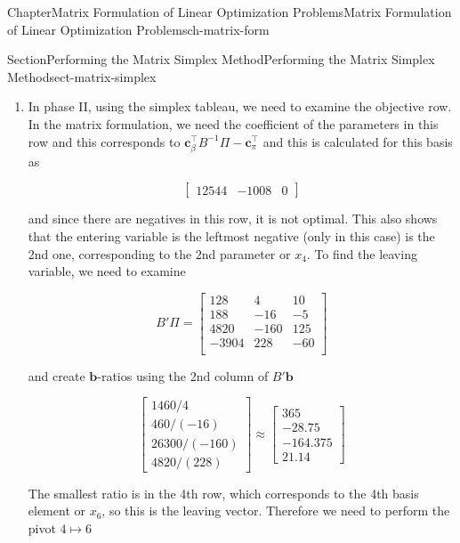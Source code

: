 \documentclass[oneside,10pt,]{book}
\numberwithin{equation}{section}
\newcommand{\amp}{&}
\begin{document}
\begin{chapterptx}{Chapter}{Matrix Formulation of Linear Optimization Problems}{}{Matrix Formulation of Linear Optimization Problems}{}{}{ch-matrix-form}
\begin{sectionptx}{Section}{Performing the Matrix Simplex Method}{}{Performing the Matrix Simplex Method}{}{}{sect-matrix-simplex}
\begin{introduction}{}
\begin{enumerate}
\begin{equation*}
\end{equation*}
%
\par
There are no negatives in this vector so phase I is complete and we move to phase II.%
\item{}In phase II, using the simplex tableau, we need to examine the objective row. In the matrix formulation, we need the coefficient of the parameters in this row and this corresponds to \(\boldsymbol{c}_{\beta}^{\intercal}B^{-1}\Pi - \boldsymbol{c}_{\pi}^{\intercal}\) and this is calculated for this basis as%
\par
%
\begin{equation*}
\begin{bmatrix} 12544 \amp  -1008  \amp 0 \end{bmatrix}
\end{equation*}
%
\par
and since there are negatives in this row, it is not optimal. This also shows that the entering variable is the leftmost negative (only in this case) is the 2nd one, corresponding to the 2nd parameter or \(x_4\). To find the leaving variable, we need to examine%
\par
%
\begin{equation*}
B' \Pi = \begin{bmatrix} 128 \amp    4 \amp  10 \\ 188 \amp  -16 \amp  -5 \\ 4820 \amp -160 \amp 125 \\ -3904 \amp  228 \amp -60 \\ \end{bmatrix}
\end{equation*}
%
\par
and create \(\boldsymbol{b}\)-ratios using the 2nd column of \(B' \boldsymbol{b}\)%
\par
%
\begin{equation*}
\begin{bmatrix} 1460/4 \\ 460/(-16) \\ 26300/(-160) \\ 4820/(228) \end{bmatrix} \approx \begin{bmatrix} 365 \\ -28.75 \\ -164.375 \\ 21.14 \end{bmatrix}
\end{equation*}
%
\par
The smallest ratio is in the 4th row, which corresponds to the 4th basis element or \(x_6\), so this is the leaving vector. Therefore we need to perform the pivot \(4 \mapsto 6\)%

\end{enumerate}
\end{introduction}
\end{sectionptx}
\end{chapterptx}
\end{document}

